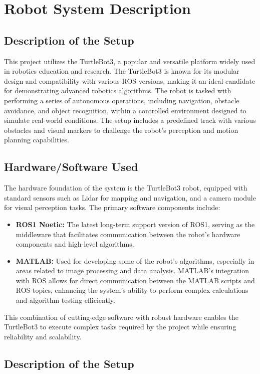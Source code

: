 \documentclass{article}
\begin{document}
	\section{Robot System Description}
	\subsection{Description of the Setup}
	This project utilizes the TurtleBot3, a popular and versatile platform widely used in robotics education and research. The TurtleBot3 is known for its modular design and compatibility with various ROS versions, making it an ideal candidate for demonstrating advanced robotics algorithms. The robot is tasked with performing a series of autonomous operations, including navigation, obstacle avoidance, and object recognition, within a controlled environment designed to simulate real-world conditions. The setup includes a predefined track with various obstacles and visual markers to challenge the robot's perception and motion planning capabilities.
	
	\subsection{Hardware/Software Used}
	The hardware foundation of the system is the TurtleBot3 robot, equipped with standard sensors such as Lidar for mapping and navigation, and a camera module for visual perception tasks. The primary software components include:
	\begin{itemize}
		\item \textbf{ROS1 Noetic:} The latest long-term support version of ROS1, serving as the middleware that facilitates communication between the robot's hardware components and high-level algorithms.
		\item \textbf{MATLAB:} Used for developing some of the robot's algorithms, especially in areas related to image processing and data analysis. MATLAB's integration with ROS allows for direct communication between the MATLAB scripts and ROS topics, enhancing the system's ability to perform complex calculations and algorithm testing efficiently.
	\end{itemize}
	This combination of cutting-edge software with robust hardware enables the TurtleBot3 to execute complex tasks required by the project while ensuring reliability and scalability.
	
	\subsection{Description of the Setup}
\end{document}
